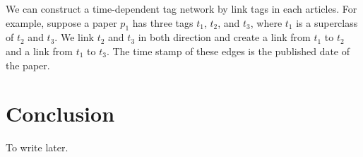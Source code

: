 \documentclass[12pt]{article}
\theoremstyle{definition}
\begin{document}
We can construct a time-dependent tag network by link tags in each articles. For example,
suppose a paper $p_1$ has three tags $t_1$, $t_2$, and $t_3$, where $t_1$ is a superclass of $t_2$ and $t_3$.
We link $t_2$ and $t_3$ in both direction and create a link from $t_1$ to $t_2$ and a link from $t_1$ to $t_3$.
The time stamp of these edges is the published date of the paper.



\section{Conclusion}
\label{sec:conclusion}

To write later.



\end{document}

